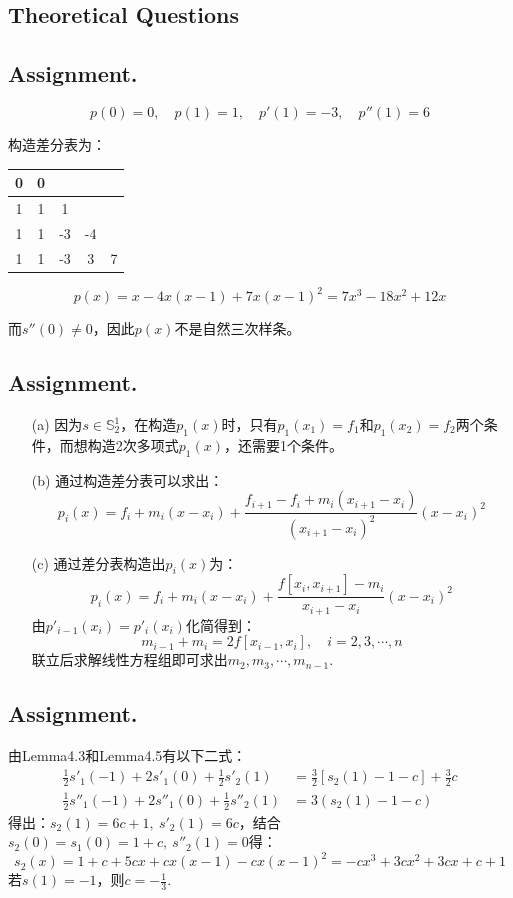 \documentclass[a4paper,11.5pt,UTF8]{ctexart}
\begin{document}
\begin{large}
	
\section{Theoretical Questions}
\subsection{Assignment.\uppercase\expandafter{}}
$$ p(0)=0,\quad p(1)=1,\quad p'(1)=-3,\quad p''(1)=6 $$
\par 构造差分表为：
\begin{center}
	\begin{tabular}{c|c c c c}
		0 & 0 & & & \\
		\hline
		1 & 1 & 1 &  & \\
		\hline
		1 & 1 & -3 & -4 & \\
		\hline
		1 & 1 & -3 & 3 & 7
	\end{tabular}
\end{center}
$$ p(x)=x-4x(x-1)+7x(x-1)^2=7x^3-18x^2+12x $$
\par 而$s''(0)\neq 0$，因此$p(x)$不是自然三次样条。

\subsection{Assignment.\uppercase\expandafter{}}
\begin{itemize}
	\item[(a)] 因为$s\in \mathbb{S} ^1_2$，在构造$p_1(x)$时，只有$p_1(x_1)=f_1$和$p_1(x_2)=f_2$两个条件，而想构造2次多项式$p_1(x)$，还需要1个条件。
	\item[(b)] 通过构造差分表可以求出：
	$$p_i(x)=f_i+m_i(x-x_i)+\frac{f_{i+1}-f_i+m_i(x_{i+1}-x_i)}{(x_{i+1}-x_i)^2}(x-x_i)^2$$
	\item[(c)] 通过差分表构造出$p_i(x)$为：
	$$p_i(x)=f_i+m_i(x-x_i)+\frac{f[x_i,x_{i+1}]-m_i}{x_{i+1}-x_i}(x-x_i)^2$$
	由$p'_{i-1}(x_i)=p'_i(x_i)$化简得到：
	$$m_{i-1}+m_i=2f[x_{i-1},x_i],\quad i=2,3,\cdots,n$$
	联立后求解线性方程组即可求出$m_2,m_3,\cdots,m_{n-1}$.
\end{itemize}

\subsection{Assignment.\uppercase\expandafter{}}
由Lemma4.3和Lemma4.5有以下二式：
\begin{align*}
	\frac{1}{2}s'_1(-1)+2s'_1(0)+\frac{1}{2}s'_2(1) & =\frac{3}{2}\left[s_2(1)-1-c\right]+\frac{3}{2}c \\
	\frac{1}{2}s''_1(-1)+2s''_1(0)+\frac{1}{2}s''_2(1) & = 3\left(s_2(1)-1-c\right)
\end{align*}
得出：$s_2(1)=6c+1,\ s'_2(1)=6c$，结合$s_2(0)=s_1(0)=1+c,\ s''_2(1)=0$得：
$$s_2(x)=1+c+5cx+cx(x-1)-cx(x-1)^2=-cx^3+3cx^2+3cx+c+1$$
若$s(1)=-1$，则$c=-\frac{1}{3}$.


\end{large}
\end{document}
